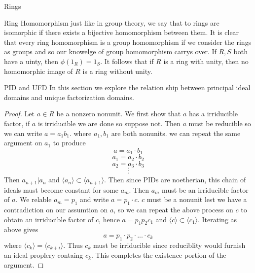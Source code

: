 \documentclass[11pt]{report}
\theoremstyle{break}
\begin{document}
\begin{chapter}{Rings}
\begin{section}{Ring Homomorphism}
    just like in group theory, we say that to rings are isomorphic if there exists a bijective homomorphism between them. 
    It is clear that every ring homomorphism is a group homomorphism if we consider the rings as groups and so our knowelge of 
    group homomorphism carrys over. If $R, S$ both have a uinty, then $\phi(1_R) = 1_S$. It follows that if $R$ is a ring with unity, 
    then no homomorphic image of $R$ is a ring without unity. 
\end{section}   
    
\begin{section}{PID and UFD}
    In this section we explore the relation ship between principal ideal domains and unique factorization domains.
    
    \begin{proof}
        Let $a \in R$ be a nonzero nonunit. We first show that $a$ has a irriducible factor, if $a$ is irriducible we are done so 
        suppose not. Then $a$ must be reducible so we can write $a = a_1b_1$. where $a_1, b_1$ are both nonunits. 
        we can repeat the same argument on $a_1$ to produce 
        \[a = a_1 \cdot b_1 \]
        \[a_1 = a_2 \cdot b_2 \]
        \[a_2 = a_3 \cdot b_3 \]
        \[ \cdot \]
        \[\cdot \]
        \[ \cdot \] 
        Then $a_{n+1} | a_n$ and $\langle a_n \rangle \subset \langle a_{n+1} \rangle$. Then since PIDs are noetherian, 
        this chain of ideals must become constant for some $a_m$. Then $a_m$ must be an irriducible factor of $a$. We relable 
        $a_m = p_1$ and write $a = p_1 \cdot c$. $c$ must be a nonunit lest we have a contradiction on our assumtion on $a$, so 
        we can repeat the above process on $c$ to obtain an irriducible factor of $c$, hence $a = p_1p_2c_1$ and 
        $\langle c \rangle \subset \langle c_1 \rangle$. Iterating as above gives 
        \[a = p_1 \cdot p_2 \cdot ... \cdot c_k \]
        where $\langle c_k \rangle = \langle c_{k+i} \rangle$. Thus $c_k$ must be irriducible since reduciblity would furnish an ideal 
        proplery containg $c_k$. This completes the existence portion of the argument.  

    \end{proof}
\end{section}
    
\end{chapter}
\end{document}
